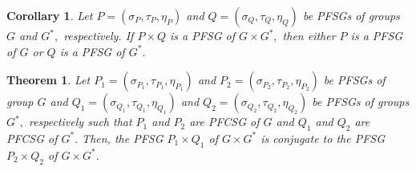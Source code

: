 \documentclass[12pt,letterpaper]{amsart}
\theoremstyle{plain}
\newtheorem{theorem}{Theorem}[section]
\newtheorem{corollary}{Corollary}[section]
\theoremstyle{definition}
\numberwithin{equation}{section}
\begin{document}
\begin{corollary}
Let $P = (\sigma_P, \tau_P, \eta_P)$ and $Q = (\sigma_Q, \tau_Q, \eta_Q)$ be PFSGs of groups $G$ and $G^{*},$ respectively. If $P \times Q$ is a PFSG of $G \times G^*,$ then either $P$ is a PFSG of $G$ or $Q$ is a PFSG of $G^*.$
\end{corollary}

\begin{theorem}
Let $P_1 = (\sigma_{P_1}, \tau_{P_1}, \eta_{P_1})$ and $P_2 = (\sigma_{P_2}, \tau_{P_2}, \eta_{P_2})$ be PFSGs of group $G$ and $Q_1 = (\sigma_{Q_1}, \tau_{Q_1}, \eta_{Q_1})$ and $Q_2 = (\sigma_{Q_2}, \tau_{Q_2}, \eta_{Q_2})$ be PFSGs of groups $G^{*},$ respectively such that $P_1$ and $P_2$ are PFCSG of $G$ and $Q_1$ and $Q_2$ are PFCSG of $G^*.$ Then, the PFSG $P_1 \times Q_1$ of $G \times G^*$ is conjugate to the PFSG $P_2 \times Q_2$ of $G \times G^*.$
\end{theorem}
\end{document}

